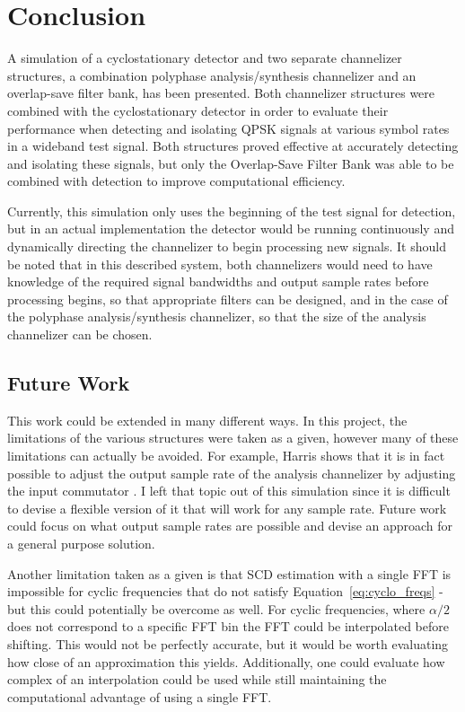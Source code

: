 \documentclass[12pt]{report}
\begin{document}
\chapter{Conclusion}
\label{sec:conclusion}
A simulation of a cyclostationary detector and two separate channelizer
structures, a combination polyphase analysis/synthesis channelizer and an
overlap-save filter bank, has been presented. Both channelizer structures
were combined with the cyclostationary detector in order to evaluate their
performance when detecting and isolating QPSK signals at various symbol rates
in a wideband test signal. Both structures proved effective at accurately
detecting and isolating these signals, but only the Overlap-Save Filter Bank
was able to be combined with detection to improve computational efficiency.

Currently, this simulation only uses the beginning of the test signal for
detection, but in an actual implementation the detector would be running
continuously and dynamically directing the channelizer to begin processing new
signals. It should be noted that in this described system, both channelizers would
need to have knowledge of the required signal bandwidths and output sample
rates before processing begins, so that appropriate filters can be designed, and
in the case of the polyphase analysis/synthesis channelizer, so that the size
of the analysis channelizer can be chosen.

\section{Future Work}
This work could be extended in many different ways. In this project, the
limitations of the various structures were taken as a given, however many of
these limitations can actually be avoided. For example, Harris shows that it is
in fact possible to adjust the output sample rate of the analysis channelizer
by adjusting the input commutator \cite{Harris1}. I left that topic out of this
simulation since it is difficult to devise a flexible version of it that will
work for any sample rate. Future work could focus on what output sample rates
are possible and devise an approach for a general purpose solution.

Another limitation taken as a given is that SCD estimation with a single FFT is
impossible for cyclic frequencies that do not satisfy
Equation~\ref{eq:cyclo_freqs} - but this could potentially be overcome as well.
For cyclic frequencies, where $\alpha/2$ does not correspond to a specific FFT
bin the FFT could be interpolated before shifting. This would not be perfectly
accurate, but it would be worth evaluating how close of an approximation this
yields. Additionally, one could evaluate how complex of an interpolation could
be used while still maintaining the computational advantage of using a single FFT.
\end{document}

